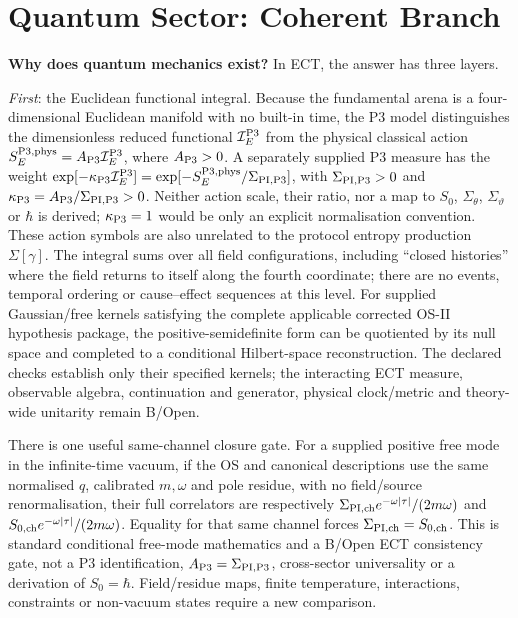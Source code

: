 \documentclass[11pt,a4paper]{article}
\begin{document}
\clearpage

\clearpage

\part{Quantum Sector: Coherent Branch}
\label{part:quantum_pop}

\noindent\textbf{Why does quantum mechanics exist?} In ECT, the answer has three layers.

\emph{First}: the Euclidean functional integral. Because the
fundamental arena is a four-dimensional Euclidean manifold with no built-in
time, the P3 model distinguishes the dimensionless reduced functional
$\mathcal I_E^{\rm P3}$ from the physical classical action
$S_E^{{\rm P3},{\rm phys}}=A_{\rm P3}\mathcal I_E^{\rm P3}$, where
$A_{\rm P3}>0$.  A separately supplied P3 measure has the weight
$\exp[-\kappa_{\rm P3}\mathcal I_E^{\rm P3}]
=\exp[-S_E^{{\rm P3},{\rm phys}}/\Sigma_{\rm PI,P3}]$, with
$\Sigma_{\rm PI,P3}>0$ and
$\kappa_{\rm P3}=A_{\rm P3}/\Sigma_{\rm PI,P3}>0$.  Neither action scale,
their ratio, nor a map to $S_0$, $\Sigma_\theta$, $\Sigma_\vartheta$ or
$\hbar$ is derived; $\kappa_{\rm P3}=1$ would be only an explicit
normalisation convention.  These action symbols are also unrelated to the
protocol entropy production $\Sigma[\gamma]$.  The integral sums over
all field configurations, including ``closed histories'' where the field
returns to itself along the fourth coordinate; there are no events, temporal
ordering or cause--effect sequences at this level.  For supplied
Gaussian/free kernels satisfying the complete applicable corrected OS-II
hypothesis package, the positive-semidefinite form can be quotiented by its
null space and completed to a conditional Hilbert-space reconstruction.  The
declared checks establish only their specified kernels; the interacting ECT
measure, observable algebra, continuation and generator, physical
clock/metric and theory-wide unitarity remain B/Open.

There is one useful same-channel closure gate.  For a supplied positive free
mode in the infinite-time vacuum, if the OS and canonical descriptions use
the same normalised $q$, calibrated $m,\omega$ and pole residue, with no
field/source renormalisation, their full correlators are respectively
$\Sigma_{\rm PI,ch}e^{-\omega|\tau|}/(2m\omega)$ and
$S_{0,{\rm ch}}e^{-\omega|\tau|}/(2m\omega)$.  Equality for that same channel
forces $\Sigma_{\rm PI,ch}=S_{0,{\rm ch}}$.  This is standard conditional
free-mode mathematics and a B/Open ECT consistency gate, not a P3
identification, $A_{\rm P3}=\Sigma_{\rm PI,P3}$, cross-sector universality or
a derivation of $S_0=\hbar$.  Field/residue maps, finite temperature,
interactions, constraints or non-vacuum states require a new comparison.
\end{document}
